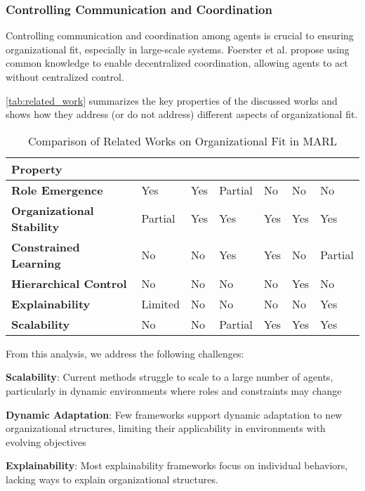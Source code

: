 \documentclass[sigconf,anonymous]{aamas}
\begin{document}
\subsubsection{Controlling Communication and Coordination}
Controlling communication and coordination among agents is crucial to ensuring organizational fit, especially in large-scale systems. Foerster et al. \cite{foerster2018communication} propose using common knowledge to enable decentralized coordination, allowing agents to act without centralized control.

\autoref{tab:related_work} summarizes the key properties of the discussed works and shows how they address (or do not address) different aspects of organizational fit.

\begin{table}[ht]
    \centering
    \small
    \renewcommand{\arraystretch}{1.3}
    \caption{Comparison of Related Works on Organizational Fit in MARL}
    \label{tab:related_work}
    \begin{tabular}{m{2.1cm} >{\centering\arraybackslash}m{0.8cm} >{\centering\arraybackslash}m{0.5cm} >{\centering\arraybackslash}m{0.8cm} >{\centering\arraybackslash}m{0.5cm} >{\centering\arraybackslash}m{0.5cm} >{\centering\arraybackslash}m{0.8cm}}

        \textbf{Property} & \textbf{\cite{yang2021role}} & \textbf{\cite{grover2018role}} & \textbf{\cite{borsa2019constrained}} & \textbf{\cite{zhang2020safemarl}} & \textbf{\cite{ghavamzadeh2006hrl}} & \textbf{\cite{foerster2018communication}} \\
        \hline \vspace{0.2cm}
        \textbf{Role Emergence} & Yes & Yes & Partial & No & No & No \\
        \textbf{Organizational Stability} & Partial & Yes & Yes & Yes & Yes & Yes \\
        \textbf{Constrained Learning} & No & No & Yes & Yes & No & Partial \\
        \textbf{Hierarchical Control} & No & No & No & No & Yes & No \\
        \textbf{Explainability} & Limited & No & No & No & No & Yes \\
        \textbf{Scalability} & No & No & Partial & Yes & Yes & Yes
    \end{tabular}%
\end{table}

\noindent From this analysis, we address the following challenges:
\begin{itemize*}[label={}, itemjoin={;\quad}]
    \item \textbf{Scalability}: Current methods struggle to scale to a large number of agents, particularly in dynamic environments where roles and constraints may change
    \item \textbf{Dynamic Adaptation}: Few frameworks support dynamic adaptation to new organizational structures, limiting their applicability in environments with evolving objectives
    \item \textbf{Explainability}: Most explainability frameworks focus on individual behaviors, lacking ways to explain organizational structures.
\end{itemize*}
\end{document}
